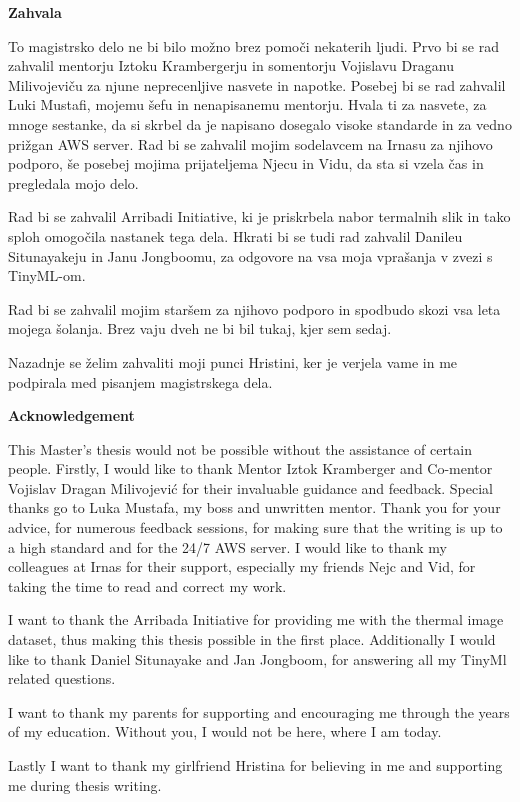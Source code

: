 \begin{poglavje}
\noindent\bfseries Zahvala
\end{poglavje}

To magistrsko delo ne bi bilo možno brez pomoči nekaterih ljudi.
Prvo bi se rad zahvalil mentorju Iztoku Krambergerju in somentorju Vojislavu Draganu Milivojeviču za njune neprecenljive nasvete in napotke.
Posebej bi se rad zahvalil Luki Mustafi, mojemu šefu in nenapisanemu mentorju.
Hvala ti za nasvete, za mnoge sestanke, da si skrbel da je napisano dosegalo visoke standarde in za vedno prižgan AWS server.
Rad bi se zahvalil mojim sodelavcem na Irnasu za njihovo podporo, še posebej mojima prijateljema Njecu in Vidu, da sta si vzela čas in pregledala mojo delo.

Rad bi se zahvalil Arribadi Initiative, ki je priskrbela nabor termalnih slik in tako sploh omogočila nastanek tega dela.
Hkrati bi se tudi rad zahvalil Danileu Situnayakeju in Janu Jongboomu, za odgovore na vsa moja vprašanja v zvezi s TinyML-om.

Rad bi se zahvalil mojim staršem za njihovo podporo in spodbudo skozi vsa leta mojega šolanja.
Brez vaju dveh ne bi bil tukaj, kjer sem sedaj.

Nazadnje se želim zahvaliti moji punci Hristini, ker je verjela vame in me podpirala med pisanjem magistrskega dela.
\clearpage

\begin{poglavje}
\noindent\bfseries Acknowledgement
\end{poglavje}

This Master's thesis would not be possible without the assistance of certain people.
Firstly, I would like to thank Mentor Iztok Kramberger and Co-mentor Vojislav Dragan Milivojević for their invaluable guidance and feedback.
Special thanks go to Luka Mustafa, my boss and unwritten mentor.
Thank you for your advice, for numerous feedback sessions, for making sure that the writing is up to a high standard and for the 24/7 AWS server.
I would like to thank my colleagues at Irnas for their support, especially my friends Nejc and Vid, for taking the time to read and correct my work.

I want to thank the Arribada Initiative for providing me with the thermal image dataset, thus making this thesis possible in the first place.
Additionally I would like to thank Daniel Situnayake and Jan Jongboom, for answering all my TinyMl related questions.

I want to thank my parents for supporting and encouraging me through the years of my education. 
Without you, I would not be here, where I am today.

Lastly I want to thank my girlfriend Hristina for believing in me and supporting me during thesis writing.
\newpage

